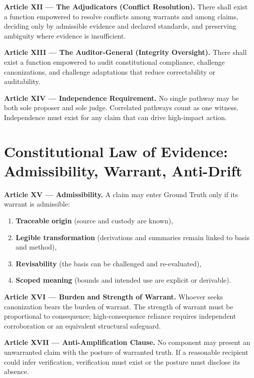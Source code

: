 \documentclass[11pt]{article}
\theoremstyle{defstyle}
\theoremstyle{mapstyle}
\begin{document}
\textbf{Article XII --- The Adjudicators (Conflict Resolution).}
There shall exist a function empowered to resolve conflicts among warrants and among claims, deciding only by admissible evidence and declared standards, and preserving ambiguity where evidence is insufficient.

\textbf{Article XIII --- The Auditor-General (Integrity Oversight).}
There shall exist a function empowered to audit constitutional compliance, challenge canonizations, and challenge adaptations that reduce correctability or auditability.

\textbf{Article XIV --- Independence Requirement.}
No single pathway may be both sole proposer and sole judge. Correlated pathways count as one witness. Independence must exist for any claim that can drive high-impact action.

\clearpage

\section{Constitutional Law of Evidence: Admissibility, Warrant, Anti-Drift}
\label{partv:evidence}

\textbf{Article XV --- Admissibility.}
A claim may enter Ground Truth only if its warrant is admissible:
\begin{enumerate}
  \item \textbf{Traceable origin} (source and custody are known),
  \item \textbf{Legible transformation} (derivations and summaries remain linked to basis and method),
  \item \textbf{Revisability} (the basis can be challenged and re-evaluated),
  \item \textbf{Scoped meaning} (bounds and intended use are explicit or derivable).
\end{enumerate}

\textbf{Article XVI --- Burden and Strength of Warrant.}
Whoever seeks canonization bears the burden of warrant. The strength of warrant must be proportional to consequence; high-consequence reliance requires independent corroboration or an equivalent structural safeguard.

\textbf{Article XVII --- Anti-Amplification Clause.}
No component may present an unwarranted claim with the posture of warranted truth. If a reasonable recipient could infer verification, verification must exist or the posture must disclose its absence.
\end{document}
